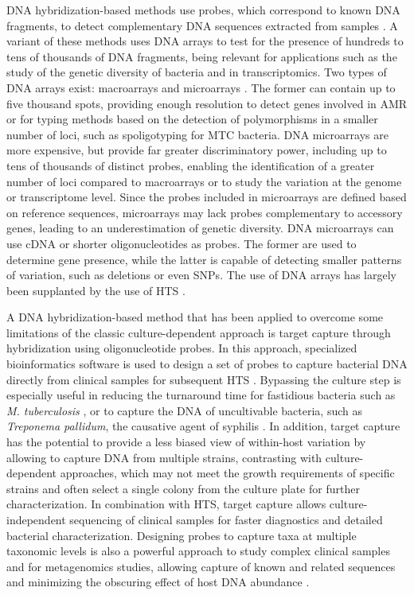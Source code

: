 \ac{DNA} hybridization-based methods use probes, which correspond to known \ac{DNA} fragments, to detect complementary \ac{DNA} sequences extracted from samples \cite{freeman_fundamentals_2000}. A variant of these methods uses \ac{DNA} arrays to test for the presence of hundreds to tens of thousands of \ac{DNA} fragments, being relevant for applications such as the study of the genetic diversity of bacteria and in transcriptomics. Two types of \ac{DNA} arrays exist: macroarrays \cite{gress_hybridization_1992, lennon_hybridization_1991} and microarrays \cite{derisi_use_1996, schena_quantitative_1995, shalon_dna_1996}. The former can contain up to five thousand spots, providing enough resolution to detect genes involved in \ac{AMR} or for typing methods based on the detection of polymorphisms in a smaller number of loci, such as spoligotyping for \ac{MTC} bacteria. \ac{DNA} microarrays are more expensive, but provide far greater discriminatory power, including up to tens of thousands of distinct probes, enabling the identification of a greater number of loci compared to macroarrays or to study the variation at the genome or transcriptome level. Since the probes included in microarrays are defined based on reference sequences, microarrays may lack probes complementary to accessory genes, leading to an underestimation of genetic diversity. \ac{DNA} microarrays can use \ac{cDNA} or shorter oligonucleotides as probes. The former are used to determine gene presence, while the latter is capable of detecting smaller patterns of variation, such as deletions or even \ac{SNPs}. The use of \ac{DNA} arrays has largely been supplanted by the use of \ac{HTS} \cite{bumgarner_dna_2013}.

A \ac{DNA} hybridization-based method that has been applied to overcome some limitations of the classic culture-dependent approach is target capture through hybridization using oligonucleotide probes. In this approach, specialized bioinformatics software is used to design a set of probes to capture bacterial \ac{DNA} directly from clinical samples for subsequent \ac{HTS} \cite{dickson_probe_2021, chafin_mrbait_2018}. Bypassing the culture step is especially useful in reducing the turnaround time for fastidious bacteria such as \textit{M. tuberculosis} \cite{macedo_molecular_2023}, or to capture the \ac{DNA} of uncultivable bacteria, such as \textit{Treponema pallidum}, the causative agent of syphilis \cite{pinto_genome-scale_2016}. In addition, target capture has the potential to provide a less biased view of within-host variation by allowing to capture \ac{DNA} from multiple strains, contrasting with culture-dependent approaches, which may not meet the growth requirements of specific strains and often select a single colony from the culture plate for further characterization. In combination with \ac{HTS}, target capture allows culture-independent sequencing of clinical samples for faster diagnostics and detailed bacterial characterization. Designing probes to capture taxa at multiple taxonomic levels is also a powerful approach to study complex clinical samples and for metagenomics studies, allowing capture of known and related sequences and minimizing the obscuring effect of host \ac{DNA} abundance \cite{dickson_probe_2021}.

